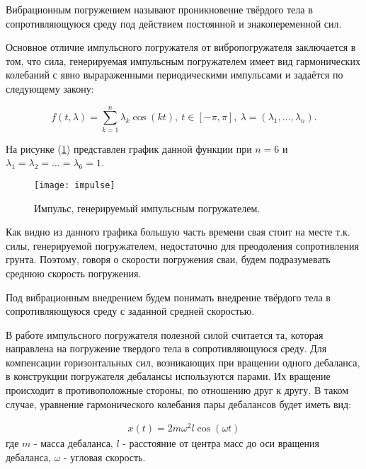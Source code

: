 \begin{definition}
    Вибрационным погружением называют проникновение твёрдого тела в сопротивляющуюся среду
    под действием постоянной и знакопеременной сил.
\end{definition}

\noindent Основное отличие импульсного погружателя от вибропогружателя заключается в том, что сила, генерируемая
импульсным погружателем имеет вид гармонических колебаний с явно вырараженными периодическими импульсами и задаётся
по следующему закону:

\begin{equation}
    f(t,\lambda)=\sum_{k=1}^n \lambda_k\cos(kt),\ t\in [-\pi,\pi],\ \lambda =(\lambda_1, \ldots,\lambda_n).
\end{equation}

\noindent На рисунке (\ref{fig:impulse}) представлен график данной функции при $n = 6$ и
$\lambda_1 = \lambda_2 = \ldots = \lambda_6 = 1$.

\begin{figure}[ht]
    \centering
    \texttt{[image: impulse]}
    \caption{Импульс, генерируемый импульсным погружателем.}
    \label{fig:impulse}
\end{figure}

\noindent Как видно из данного графика большую часть времени свая стоит на месте т.к. силы, генерируемой погружателем,
недостаточно для преодоления сопротивления грунта. Поэтому, говоря о скорости погружения сваи, будем подразумевать среднюю
скорость погружения.

\begin{definition}
    Под вибрационным внедрением будем понимать внедрение твёрдого тела в сопротивляющуюся среду с заданной
    средней скоростью.
\end{definition}

В работе импульсного погружателя полезной силой считается та, которая направлена на погружение твердого тела в
сопротивляющуюся среду. Для компенсации горизонтальных сил, возникающих при вращении одного дебаланса,
в конструкции погружателя дебалансы используются парами. Их вращение происходит в противоположные стороны, по отношению друг
к другу. В таком случае, уравнение гармонического колебания пары дебалансов будет иметь вид:

\begin{equation}
    \begin{aligned}
        x(t) = 2 m \omega^2 l \cos (\omega t)
    \end{aligned}
\end{equation}
\noindent где $m$ - масса дебаланса, $l$ - расстояние от центра масс до оси вращения дебаланса, $\omega$ - угловая скорость.

